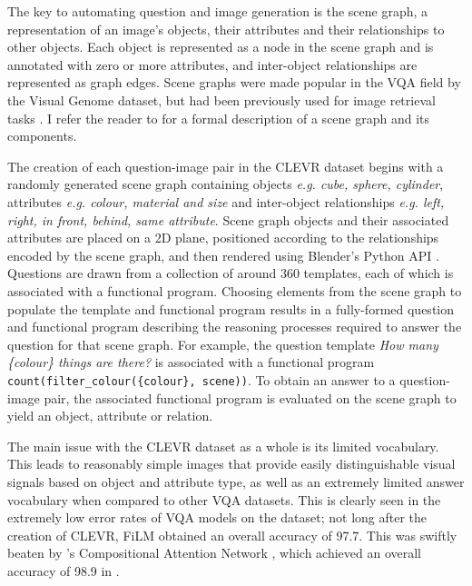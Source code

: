 The key to automating question and image generation is the scene graph, a representation of an image's objects, their attributes and their relationships to other objects. Each object is represented as a node in the scene graph and is annotated with zero or more attributes, and inter-object relationships are represented as  graph edges. Scene graphs were made popular in the VQA field by the Visual Genome dataset, but had been previously used for image retrieval tasks \cite{johnson2015image}. I refer the reader to \subsectionautorefname{ \ref{subsection:scene_graph_embedding_motivation}} for a formal description of a scene graph and its components.

The creation of each question-image pair in the CLEVR dataset begins with a randomly generated scene graph containing objects \textit{e.g. cube, sphere, cylinder}, attributes \textit{e.g. colour, material and size} and inter-object relationships \textit{e.g. left, right, in front, behind, same attribute}. Scene graph objects and their associated attributes are placed on a 2D plane, positioned according to the relationships encoded by the scene graph, and then rendered using Blender's Python API \cite{blender}. 
Questions are drawn from a collection of around 360 templates, each of which is associated with a functional program. Choosing elements from the scene graph to populate the template and functional program results in a fully-formed question and functional program describing the reasoning processes required to answer the question for that scene graph. For example, the question template \textit{How many \{colour\} things are there?} is associated with a functional program \texttt{count(filter\_colour(\{colour\}, scene))}. To obtain an answer to a question-image pair, the associated functional program is evaluated on the scene graph to yield an object, attribute or relation.

The main issue with the CLEVR dataset as a whole is its limited vocabulary. This leads to reasonably simple images that provide easily distinguishable visual signals based on object and attribute type, as well as an extremely limited answer vocabulary when compared to other VQA datasets. This is clearly seen in the extremely low error rates of VQA models on the dataset; not long after the creation of CLEVR, FiLM \cite{perez2017film} obtained an overall accuracy of 97.7. This was swiftly beaten by \citeauthor{hudson2018compositional}'s Compositional Attention Network \cite{hudson2018compositional}, which achieved an overall accuracy of 98.9 in \citeyear{hudson2018compositional}.

